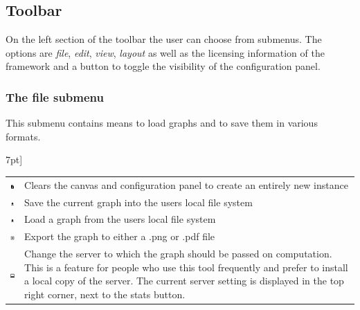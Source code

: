 \subsection{Toolbar}
On the left section of the toolbar the user can choose from submenus. The options are \textit{file}, \textit{edit}, \textit{view}, \textit{layout} as well as the licensing information of the framework and a button to toggle the visibility of the configuration panel.
\subsubsection{The file submenu}
This submenu contains means to load graphs and to save them in various formats.\\{7pt]
\begin{tabular}{p{}p{}}
\includegraphics[scale=0.6]{figures/icons/new.png} & Clears the canvas and configuration panel to create an entirely new instance\\
\includegraphics[scale=0.6]{figures/icons/download.png}& Save the current graph into the users local file system\\
\includegraphics[scale=0.6]{figures/icons/upload.png}& Load a graph from the users local file system\\
\includegraphics[scale=0.6]{figures/icons/export.png}& Export the graph to either a .png or .pdf file\\
\includegraphics[scale=0.6]{figures/icons/server.png} &Change the server to which the graph should be passed on computation. This is a feature for people who use this tool frequently and prefer to install a local copy of the server. The current server setting is displayed in the top right corner, next to the stats button. 
\end{tabular}
}
